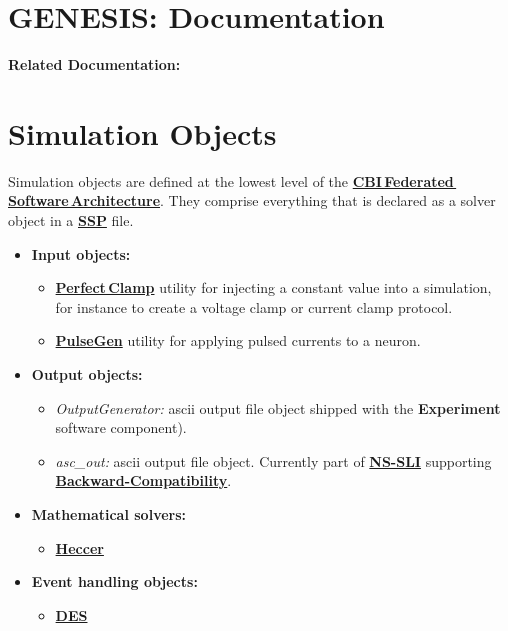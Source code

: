 \documentclass[12pt]{article}
\begin{document}
\section*{GENESIS: Documentation}

{\bf Related Documentation:}

\section*{Simulation Objects}

Simulation objects are defined at the lowest level of the
\href{../genesis-overview/genesis-overview.tex}{\bf
  CBI\,Federated\,Software\,Architecture}.  They comprise everything
that is declared as a solver object in a \href{../ssp/ssp.tex}{\bf
  SSP} file.

\begin{itemize}

\item {\bf Input objects:}
   \begin{itemize}
   \item \href{../pclamp/pclamp.tex}{\bf Perfect\,Clamp} utility for
     injecting a constant value into a simulation, for instance to
     create a voltage clamp or current clamp protocol.
   \item \href{../genesis-add-object-solver/genesis-add-object-solver.tex}{\bf PulseGen} utility for
     applying pulsed currents to a neuron.
   \end{itemize}
   
\item {\bf Output objects:}
   \begin{itemize}
   \item {\it OutputGenerator:} ascii output file object shipped with
     the {\bf Experiment} software component).
   \item {\it asc\_out:} ascii output file object.  Currently part of
     \href{../ns-sli/ns-sli.tex}{\bf NS-SLI} supporting
     \href{../backward-compatibility/backward-compatibility.tex}{\bf
       Backward-Compatibility}.
   \end{itemize}

\item{\bf Mathematical solvers:}
   \begin{itemize}
      \item \href{../heccer/heccer.tex}{\bf Heccer}
   \end{itemize}
   
\item{\bf Event handling objects:}
   \begin{itemize}
      \item \href{../des/des.tex}{\bf DES}
   \end{itemize}
   
\end{itemize}
\end{document}
